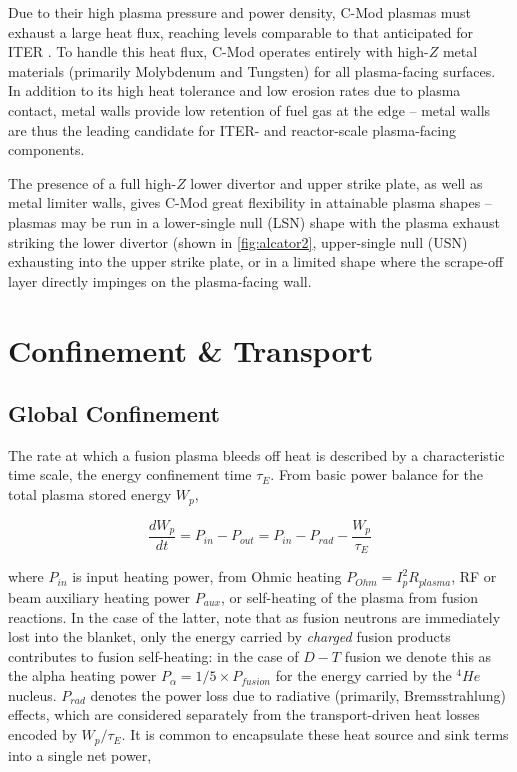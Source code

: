 Due to their high plasma pressure and power density, C-Mod plasmas must exhaust a large heat flux, reaching levels comparable to that anticipated for ITER \cite{Loarte2007,Terry2007,LaBombard2011}.  To handle this heat flux, C-Mod operates entirely with high-$Z$ metal materials (primarily Molybdenum and Tungsten) for all plasma-facing surfaces.  In addition to its high heat tolerance and low erosion rates due to plasma contact, metal walls provide low retention of fuel gas at the edge -- metal walls are thus the leading candidate for ITER- and reactor-scale plasma-facing components.

The presence of a full high-$Z$ lower divertor and upper strike plate, as well as metal limiter walls, gives C-Mod great flexibility in attainable plasma shapes -- plasmas may be run in a lower-single null (LSN) shape with the plasma exhaust  striking the lower divertor (shown in \cref{fig:alcator2}, upper-single null (USN) exhausting into the upper strike plate, or in a limited shape where the scrape-off layer directly impinges on the plasma-facing wall.\nicesectionending


\section{Confinement \& Transport}\label{sec:intro_confinement}

\subsection{Global Confinement}\label{subsec:intro_global}

The rate at which a fusion plasma bleeds off heat is described by a characteristic time scale, the energy confinement time $\tau_E$.  From basic power balance for the total plasma stored energy $W_p$,

\begin{equation}\label{eq:powerbalance}
 \frac{dW_p}{dt} = P_{in} - P_{out} = P_{in} - P_{rad} - \frac{W_p}{\tau_E}
\end{equation}

\noindent where $P_{in}$ is input heating power, from Ohmic heating $P_{Ohm} = I_p^2 R_{plasma}$, RF or beam auxiliary heating power $P_{aux}$, or self-heating of the plasma from fusion reactions.  In the case of the latter, note that as fusion neutrons are immediately lost into the blanket, only the energy carried by \emph{charged} fusion products contributes to fusion self-heating: in the case of $\si{D} - \si{T}$ fusion we denote this as the alpha heating power $P_{\alpha} = 1/5 \times P_{fusion}$ for the energy carried by the ${}^4\si{He}$ nucleus.  $P_{rad}$ denotes the power loss due to radiative (primarily, Bremsstrahlung) effects, which are considered separately from the transport-driven heat losses encoded by $W_p/\tau_E$.  It is common to encapsulate these heat source and sink terms into a single net power,

